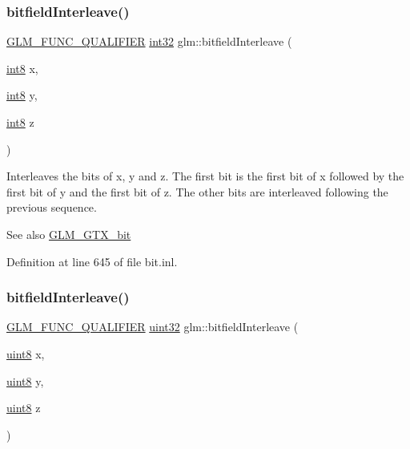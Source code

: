 \subsubsection{\texorpdfstring{bitfield\+Interleave()}{bitfieldInterleave()}\hspace{0.1cm}{\footnotesize\ttfamily [7/16]}}
{\footnotesize\ttfamily \hyperlink{setup_8hpp_a33fdea6f91c5f834105f7415e2a64407}{G\+L\+M\+\_\+\+F\+U\+N\+C\+\_\+\+Q\+U\+A\+L\+I\+F\+I\+ER} \hyperlink{group__gtc__type__precision_ga632d8b25f6b61659f39ea4321fab92a4}{int32} glm\+::bitfield\+Interleave (\begin{DoxyParamCaption}\item[{\hyperlink{group__gtc__type__precision_ga96254f9c1c4506fc8eb5cf3301ce8565}{int8}}]{x,  }\item[{\hyperlink{group__gtc__type__precision_ga96254f9c1c4506fc8eb5cf3301ce8565}{int8}}]{y,  }\item[{\hyperlink{group__gtc__type__precision_ga96254f9c1c4506fc8eb5cf3301ce8565}{int8}}]{z }\end{DoxyParamCaption})}

Interleaves the bits of x, y and z. The first bit is the first bit of x followed by the first bit of y and the first bit of z. The other bits are interleaved following the previous sequence.

\begin{DoxySeeAlso}{See also}
\hyperlink{group__gtx__bit}{G\+L\+M\+\_\+\+G\+T\+X\+\_\+bit} 
\end{DoxySeeAlso}


Definition at line 645 of file bit.\+inl.

\mbox{\label{group__gtx__bit_gab9d593a2e916beb8f8137a0dbeae3afe}} 
\subsubsection{\texorpdfstring{bitfield\+Interleave()}{bitfieldInterleave()}\hspace{0.1cm}{\footnotesize\ttfamily [8/16]}}
{\footnotesize\ttfamily \hyperlink{setup_8hpp_a33fdea6f91c5f834105f7415e2a64407}{G\+L\+M\+\_\+\+F\+U\+N\+C\+\_\+\+Q\+U\+A\+L\+I\+F\+I\+ER} \hyperlink{group__gtc__type__precision_ga202b6a53c105fcb7e531f9b443518451}{uint32} glm\+::bitfield\+Interleave (\begin{DoxyParamCaption}\item[{\hyperlink{group__gtc__type__precision_ga1a7dcd8aac97cc8020817c94049deff2}{uint8}}]{x,  }\item[{\hyperlink{group__gtc__type__precision_ga1a7dcd8aac97cc8020817c94049deff2}{uint8}}]{y,  }\item[{\hyperlink{group__gtc__type__precision_ga1a7dcd8aac97cc8020817c94049deff2}{uint8}}]{z }\end{DoxyParamCaption})}

